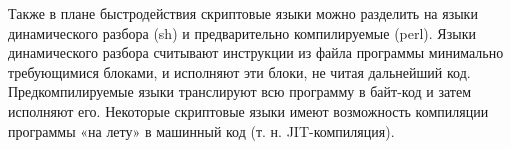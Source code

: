 Также в плане быстродействия скриптовые языки можно разделить на языки динамического разбора (sh) и предварительно компилируемые (perl). Языки динамического разбора считывают инструкции из файла программы минимально требующимися блоками, и исполняют эти блоки, не читая дальнейший код. Предкомпилируемые языки транслируют всю программу в байт-код и затем исполняют его. Некоторые скриптовые языки имеют возможность компиляции программы «на лету» в машинный код (т. н. JIT-компиляция).